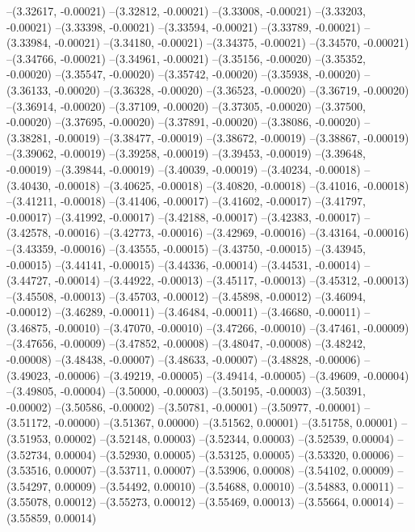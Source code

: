 --(3.32617, -0.00021)
--(3.32812, -0.00021)
--(3.33008, -0.00021)
--(3.33203, -0.00021)
--(3.33398, -0.00021)
--(3.33594, -0.00021)
--(3.33789, -0.00021)
--(3.33984, -0.00021)
--(3.34180, -0.00021)
--(3.34375, -0.00021)
--(3.34570, -0.00021)
--(3.34766, -0.00021)
--(3.34961, -0.00021)
--(3.35156, -0.00020)
--(3.35352, -0.00020)
--(3.35547, -0.00020)
--(3.35742, -0.00020)
--(3.35938, -0.00020)
--(3.36133, -0.00020)
--(3.36328, -0.00020)
--(3.36523, -0.00020)
--(3.36719, -0.00020)
--(3.36914, -0.00020)
--(3.37109, -0.00020)
--(3.37305, -0.00020)
--(3.37500, -0.00020)
--(3.37695, -0.00020)
--(3.37891, -0.00020)
--(3.38086, -0.00020)
--(3.38281, -0.00019)
--(3.38477, -0.00019)
--(3.38672, -0.00019)
--(3.38867, -0.00019)
--(3.39062, -0.00019)
--(3.39258, -0.00019)
--(3.39453, -0.00019)
--(3.39648, -0.00019)
--(3.39844, -0.00019)
--(3.40039, -0.00019)
--(3.40234, -0.00018)
--(3.40430, -0.00018)
--(3.40625, -0.00018)
--(3.40820, -0.00018)
--(3.41016, -0.00018)
--(3.41211, -0.00018)
--(3.41406, -0.00017)
--(3.41602, -0.00017)
--(3.41797, -0.00017)
--(3.41992, -0.00017)
--(3.42188, -0.00017)
--(3.42383, -0.00017)
--(3.42578, -0.00016)
--(3.42773, -0.00016)
--(3.42969, -0.00016)
--(3.43164, -0.00016)
--(3.43359, -0.00016)
--(3.43555, -0.00015)
--(3.43750, -0.00015)
--(3.43945, -0.00015)
--(3.44141, -0.00015)
--(3.44336, -0.00014)
--(3.44531, -0.00014)
--(3.44727, -0.00014)
--(3.44922, -0.00013)
--(3.45117, -0.00013)
--(3.45312, -0.00013)
--(3.45508, -0.00013)
--(3.45703, -0.00012)
--(3.45898, -0.00012)
--(3.46094, -0.00012)
--(3.46289, -0.00011)
--(3.46484, -0.00011)
--(3.46680, -0.00011)
--(3.46875, -0.00010)
--(3.47070, -0.00010)
--(3.47266, -0.00010)
--(3.47461, -0.00009)
--(3.47656, -0.00009)
--(3.47852, -0.00008)
--(3.48047, -0.00008)
--(3.48242, -0.00008)
--(3.48438, -0.00007)
--(3.48633, -0.00007)
--(3.48828, -0.00006)
--(3.49023, -0.00006)
--(3.49219, -0.00005)
--(3.49414, -0.00005)
--(3.49609, -0.00004)
--(3.49805, -0.00004)
--(3.50000, -0.00003)
--(3.50195, -0.00003)
--(3.50391, -0.00002)
--(3.50586, -0.00002)
--(3.50781, -0.00001)
--(3.50977, -0.00001)
--(3.51172, -0.00000)
--(3.51367, 0.00000)
--(3.51562, 0.00001)
--(3.51758, 0.00001)
--(3.51953, 0.00002)
--(3.52148, 0.00003)
--(3.52344, 0.00003)
--(3.52539, 0.00004)
--(3.52734, 0.00004)
--(3.52930, 0.00005)
--(3.53125, 0.00005)
--(3.53320, 0.00006)
--(3.53516, 0.00007)
--(3.53711, 0.00007)
--(3.53906, 0.00008)
--(3.54102, 0.00009)
--(3.54297, 0.00009)
--(3.54492, 0.00010)
--(3.54688, 0.00010)
--(3.54883, 0.00011)
--(3.55078, 0.00012)
--(3.55273, 0.00012)
--(3.55469, 0.00013)
--(3.55664, 0.00014)
--(3.55859, 0.00014)
